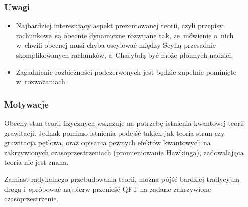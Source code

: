 \documentclass[10pt,t]{beamer}
\begin{document}
\begin{frame}
  \frametitle{Uwagi}


  \begin{itemize}
    \RaggedRight

  \item Najbardziej interesujący aspekt prezentowanej teorii,
    czyli przepisy rachunkowe~są obecnie dynamiczne
    rozwijane tak, że~mówienie o~nich w~chwili obecnej musi chyba
    oscylować między Scyllą przesadnie skomplikowanych rachunków,
    a~Charybdą być może płonnych nadziei.

  \item Zagadnienie rozbieżności podczerwonych jest będzie
    zupełnie pominięte w~rozważaniach.

  \end{itemize}

\end{frame}





\begin{frame}
  \frametitle{Motywacje}


    Obecny stan teorii fizycznych wskazuje na potrzebę istnienia
    kwantowej teorii grawitacji. Jednak pomimo istnienia podejść
    takich jak teoria strun czy grawitacja pętlowa, oraz opisania
    pewnych efektów kwantowych na zakrzywionych czasoprzestrzeniach
    (promieniowanie Hawkinga), zadowalająca teoria nie jest znana.

    Zamiast radykalnego przebudowania teorii, można pójść bardziej
    tradycyjną drogą i~spróbować najpierw przenieść QFT na zadane
    zakrzywione czasoprzestrzenie.

\end{frame}
\end{document}
